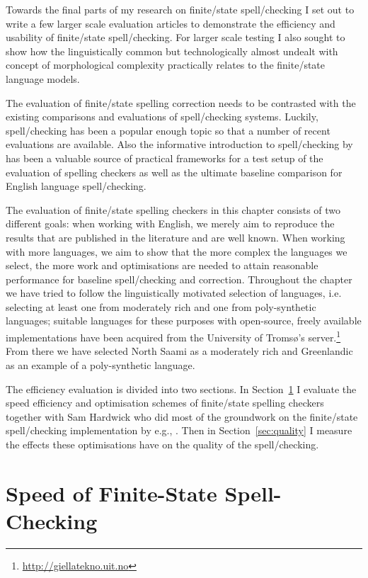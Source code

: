 \documentclass[officiallayout,final]{unihelcompling}
\begin{document}
Towards the final parts of my research on finite\-/state spell\-/checking I set
out to write a few larger scale evaluation articles to demonstrate the
efficiency and usability of finite\-/state spell\-/checking. For larger scale
testing I also sought to show how the linguistically common but technologically
almost undealt with concept of \gls{morphological complexity} practically
relates to the finite\-/state language models.

The evaluation of finite\-/state spelling correction needs to be contrasted
with the existing comparisons and evaluations of spell\-/checking systems.
Luckily, spell\-/checking has been a popular enough topic so that a number of
recent evaluations are available.  Also the informative introduction to
spell\-/checking by~\citet{norvig2010howto} has been a valuable source of
practical frameworks for a test setup of the evaluation of spelling checkers as
well as the ultimate baseline comparison for English language spell\-/checking.

The evaluation of finite\-/state spelling checkers in this chapter consists of
two different goals: when working with English, we merely aim to reproduce the
results that are published in the literature and are well known. When working
with more 
languages, we aim to show that the more complex the languages we select, the
more work and optimisations are needed to attain reasonable performance for
baseline spell\-/checking and correction.  Throughout the chapter we have tried
to follow the linguistically motivated selection of languages, i.e. selecting
at least one from moderately rich and one from poly-synthetic languages;
suitable languages for these purposes with open-source, freely available
implementations have been acquired from the University of Tromsø's
server.\footnote{\url{http://giellatekno.uit.no}} From there we have selected
North Saami as a moderately rich and Greenlandic as an example of a
poly-synthetic language.

The efficiency evaluation is divided into two sections. In
Section~\ref{sec:speed} I evaluate the speed efficiency and optimisation
schemes of finite\-/state spelling checkers together with Sam Hardwick who did
most of the groundwork on the finite\-/state spell\-/checking implementation
by e.g.,  \citet{linden2011hfst}. Then in Section~\ref{sec:quality} I measure
the effects these optimisations have on the quality of the spell\-/checking.

\section{Speed of Finite-State Spell-Checking}
\label{sec:speed}
\end{document}

